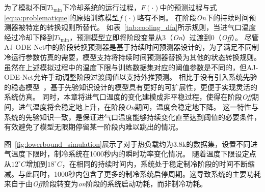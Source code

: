 为了模拟不同$Ti_{\min}$下冷却系统的运行过程，$F(\cdot)$中的预测过程与式\ref{equa:problematique}的原始训练模型$f(\cdot)$略有不同。
在阶段\textit{On}下的持续时间预测器被特定的转换规则所替代。
如表~\ref{tab:cooling_dfa}所示规则，当进气口温度经过冷却下降到$Ti_{\min}$，预测模型立即将阶段变量从3（\textit{On}）过渡到0（\textit{Off}）。
尽管AJ-ODE-Net中的阶段转换预测器是基于持续时间预测器设计的，为了满足不同制冷运行参数仿真的需要，模型支持将持续时间预测器替换为其他的状态转换规则。
虽然在上述模拟过程中的温度下限与训练数据集对应的阈值参数是不同的，但AJ-ODE-Net允许手动调整阶段过渡阈值以支持外推预测。
相比于没有引入系统先验的稳态模型~\cite{Yilmaz2007}，基于先验知识设计的模型具有更好的可扩展性，更便于实现灵活的系统仿真。
同时，本章将进气口温度的变化建模成非平稳过程，使得在阶段\textit{Off}期间，进气温度将会稳定地上升，在阶段\textit{On}期间，温度会稳定地下降。
这一特性与系统的先验知识一致，是保证进气口温度能够持续变化直至达到阈值的必要条件，有效避免了模型无限期停留某一阶段内难以跳出的情况。

图~\ref{fig:lowerbound_simulation}展示了对于热负载约为3.8k的数据集，设置不同进气温度下限时，制冷系统在1000秒内的瞬时功率变化情况。
随着温度下限设定点从$12^{\circ}C$增加到$18^{\circ}C$，在相同的持续时间内，系统处于稳定制冷阶段的时间不断缩减。与此同时，1000秒内包含了更多的制冷系统启停周期。这导致系统的主要功耗来自于由\textit{Off}阶段转变为\textit{on}阶段的系统启动功耗，而非制冷功耗。

